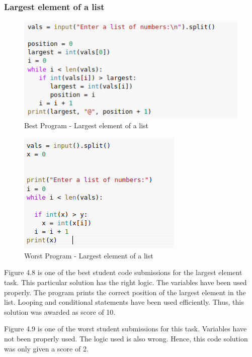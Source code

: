 \newpage

\subsubsection{Largest element of a list}

\begin{figure}[h]
\centering
\includegraphics[]{./figures/best_la.png}
\caption{Best Program - Largest element of a list}
\label{fig1}
\end{figure}

\begin{figure}[h]
\centering
\includegraphics[scale=1.2]{./figures/worst_la.png}
\caption{Worst Program - Largest element of a list}
\label{fig1}
\end{figure}

\newpage

Figure 4.8 is one of the best student code submissions for the largest element task. This particular solution has the right logic. The variables have been used properly. The program prints the correct position of the largest element in the list. Looping and conditional statements have been used efficiently. Thus, this solution was awarded as score of 10.

Figure 4.9 is one of the worst student submissions for this task. Variables have not been properly used. The logic used is also wrong. Hence, this code solution was only given a score of 2.

